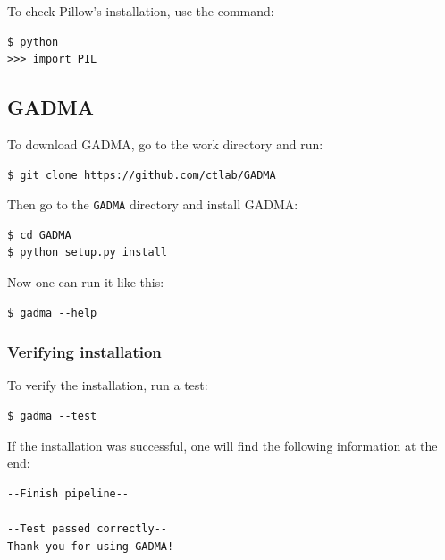 \documentclass[12pt]{article}
\makeatletter
\newcommand{\py}[1]{\lstinline[language=Python, showstringspaces=False]@#1@}
\makeatother
\begin{document}
To check Pillow's installation, use the command:

\begin{lstlisting}
$ python
>>> import PIL
\end{lstlisting}

\subsection{GADMA}
To download GADMA, go to the work directory and run:

\begin{lstlisting}
$ git clone https://github.com/ctlab/GADMA
\end{lstlisting}

Then go to the \py{GADMA} directory and install GADMA:
\begin{lstlisting}
$ cd GADMA
$ python setup.py install
\end{lstlisting}

Now one can run it like this:
\begin{lstlisting}
$ gadma --help
\end{lstlisting}

\subsubsection{Verifying installation}
To verify the installation, run a test:

\begin{lstlisting}
$ gadma --test
\end{lstlisting}

If the installation was successful, one will find the following information at the end:
\begin{lstlisting}
--Finish pipeline--

--Test passed correctly--
Thank you for using GADMA!
\end{lstlisting}
\end{document}
